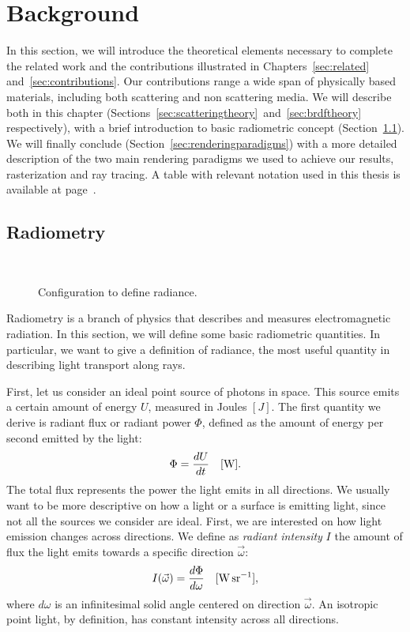 \chapter{Background}
\label{sec:background}

In this section, we will introduce the theoretical elements necessary to complete the related work and the contributions illustrated in Chapters~\ref{sec:related} and~\ref{sec:contributions}. Our contributions range a wide span of physically based materials, including both scattering and non scattering media. We will describe both in this chapter (Sections~\ref{sec:scatteringtheory}~and~\ref{sec:brdftheory} respectively), with a brief introduction to basic radiometric concept (Section~\ref{sec:radiometry}). We will finally conclude (Section~\ref{sec:renderingparadigms}) with a more detailed description of the two main rendering paradigms we used to achieve our results, rasterization and ray tracing. A table with relevant notation used in this thesis is available at page~\pageref{sec:symbols}.

\section{Radiometry}
\label{sec:radiometry}
\begin{figure}
\centering
   \def\svgwidth{0.4\textwidth}
    \\
\caption{Configuration to define radiance.} %
\label{fig:radiance}
\end{figure}
Radiometry is a branch of physics that describes and measures electromagnetic radiation. In this section, we will define some basic radiometric quantities. In particular, we want to give a definition of radiance, the most useful quantity in describing light transport along rays.

First, let us consider an ideal point source of photons in space. This source emits a certain amount of energy $U$, measured in Joules $[J]$. The first quantity we derive is radiant flux or radiant power $\Phi$, defined as the amount of energy per second emitted by the light:
\begin{equation*}
\Phi = \frac{d U}{d t}  \ \ \ [\SI{}{\watt}].
\end{equation*}
The total flux represents the power the light emits in all directions. We usually want to be more descriptive on how a light or a surface is emitting light, since not all the sources we consider are ideal. First, we are interested on how light emission changes across directions.  We  define as \emph{radiant intensity} $I$ the amount of flux the light emits towards a specific direction $\vec{\omega}$:
\begin{equation*}
I(\vec{\omega}) = \frac{d \Phi}{d \omega}  \siunit{\watt \per \steradian},
\end{equation*}   
where $d \omega$ is an infinitesimal solid angle centered on direction $\vec{\omega}$. An isotropic point light, by definition, has constant intensity across all directions.

